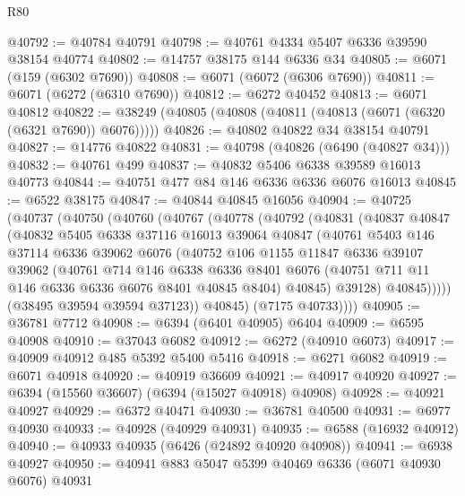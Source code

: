\begin{lexlean}{R80}
\begin{coremodule}
@40792 := @40784 @40791
@40798 := @40761 @4334 @5407 @6336 @39590 @38154 @40774
@40802 := @14757 @38175 @144 @6336 @34
@40805 := @6071 (@159 (@6302 @7690))
@40808 := @6071 (@6072 (@6306 @7690))
@40811 := @6071 (@6272 (@6310 @7690))
@40812 := @6272 @40452
@40813 := @6071 @40812
@40822 := @38249 (@40805 (@40808 (@40811 (@40813 (@6071 (@6320 (@6321 @7690)) @6076)))))
@40826 := @40802 @40822 @34 @38154 @40791
@40827 := @14776 @40822
@40831 := @40798 (@40826 (@6490 (@40827 @34)))
@40832 := @40761 @499
@40837 := @40832 @5406 @6338 @39589 @16013 @40773
@40844 := @40751 @477 @84 @146 @6336 @6336 @6076 @16013
@40845 := @6522 @38175
@40847 := @40844 @40845 @16056
@40904 := @40725
    (@40737
      (@40750
        (@40760
          (@40767
            (@40778
              (@40792
                (@40831
                  (@40837
                    @40847
                    (@40832
                      @5405
                      @6338
                      @37116
                      @16013
                      @39064
                      @40847
                      (@40761
                        @5403
                        @146
                        @37114
                        @6336
                        @39062
                        @6076
                        (@40752
                          @106
                          @1155
                          @11847
                          @6336
                          @39107
                          @39062
                          (@40761
                            @714
                            @146
                            @6338
                            @6336
                            @8401
                            @6076
                            (@40751 @711 @11 @146 @6336 @6336 @6076 @8401 @40845 @8404)
                            @40845)
                          @39128)
                        @40845)))))
              (@38495 @39594 @39594 @37123))
            @40845)
          (@7175 @40733))))
@40905 := @36781 @7712
@40908 := @6394 (@6401 @40905) @6404
@40909 := @6595 @40908
@40910 := @37043 @6082
@40912 := @6272 (@40910 @6073)
@40917 := @40909 @40912 @485 @5392 @5400 @5416
@40918 := @6271 @6082
@40919 := @6071 @40918
@40920 := @40919 @36609
@40921 := @40917 @40920
@40927 := @6394 (@15560 @36607) (@6394 (@15027 @40918) @40908)
@40928 := @40921 @40927
@40929 := @6372 @40471
@40930 := @36781 @40500
@40931 := @6977 @40930
@40933 := @40928 (@40929 @40931)
@40935 := @6588 (@16932 @40912)
@40940 := @40933 @40935 (@6426 (@24892 @40920 @40908))
@40941 := @6938 @40927
@40950 := @40941 @883 @5047 @5399 @40469 @6336 (@6071 @40930 @6076) @40931

\end{coremodule}
\end{lexlean}

